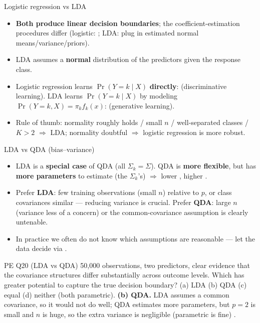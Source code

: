 \begin{topic}{Logistic regression vs LDA}
\begin{itemize}
\item \textbf{Both produce linear decision boundaries}; the coefficient-estimation procedures differ
  (logistic: ; LDA: plug in estimated normal means/variance/priors).
\item LDA assumes a \textbf{normal} distribution of the predictors given the response class.
\item Logistic regression learns $\Pr(Y=k\mid X)$ \textbf{directly}:  (discriminative learning).
  LDA learns $\Pr(Y=k\mid X)$ by modeling $\Pr(Y=k,X)=\pi_kf_k(x)$:  (generative learning).
\item Rule of thumb: normality roughly holds / small $n$ / well-separated classes / $K>2$ $\Rightarrow$ LDA;
  normality doubtful $\Rightarrow$ logistic regression is more robust.
\end{itemize}
\end{topic}

\begin{topic}{LDA vs QDA (bias--variance)}
\begin{itemize}
\item LDA is a \textbf{special case} of QDA (all $\Sigma_k=\Sigma$). QDA is \textbf{more flexible}, but has
  \textbf{more parameters} to estimate (the $\Sigma_k$'s) $\Rightarrow$ lower , higher .
\item Prefer \textbf{LDA}: few training observations (small $n$) relative to $p$, or class covariances similar
  --- reducing variance is crucial. Prefer \textbf{QDA}: large $n$ (variance less of a concern) or the
  common-covariance assumption is clearly untenable.
\item In practice we often do not know which assumptions are reasonable --- let the data decide via
   .
\end{itemize}
\end{topic}

\begin{qbox}{PE Q20 (LDA vs QDA)}
50{,}000 observations, two predictors, clear evidence that the covariance structures differ substantially
across outcome levels. Which has greater potential to capture the true decision boundary?
(a) LDA (b) QDA (c) equal (d) neither (both parametric).
\ans \textbf{(b) QDA.} LDA assumes a common covariance, so it would not do well; QDA estimates more
parameters, but $p=2$ is small and $n$ is huge, so the extra variance is negligible (parametric is fine)
.
\end{qbox}

